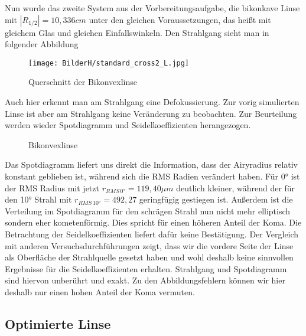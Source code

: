 \documentclass[twoside,colorback,accentcolor=tud4c,11pt]{tudreport}
\begin{document}
	Nun wurde das zweite System aus der Vorbereitungsaufgabe, die bikonkave Linse mit $|R_{1/2}| = 10,336 cm$ unter den gleichen Voraussetzungen, das heißt mit gleichem Glas und gleichen Einfallswinkeln. Den Strahlgang sieht man in folgender Abbildung 
	
	\begin{figure}[H]
\centering
   	\begin{minipage}[b]{\textwidth}
\centering   	\texttt{[image: BilderH/standard\_cross2\_L.jpg]}
   	\caption{Querschnitt der Bikonvexlinse}
  	\end{minipage}
\end{figure}
	
	Auch hier erkennt man am Strahlgang eine Defokussierung. Zur vorig simulierten Linse ist aber am Strahlgang keine Veränderung zu beobachten. Zur Beurteilung werden wieder Spotdiagramm und Seidelkoeffizienten herangezogen.
	
	\begin{figure}[H]
\centering
  \quad
  \quad   
  \caption{Bikonvexlinse}
\end{figure}
	
	Das Spotdiagramm liefert uns direkt die Information, dass der Airyradius relativ konstant geblieben ist, während sich die RMS Radien verändert haben. Für 0° ist der RMS Radius mit jetzt $r_{RMS \, 0°} = 119,40 \mu m $ deutlich kleiner, während der für den 10° Strahl mit $r_{RMS \, 10°} = 492,27 $ geringfügig gestiegen ist. Außerdem ist die Verteilung im Spotdiagramm für den schrägen Strahl nun nicht mehr elliptisch sondern eher kometenförmig. Dies spricht für einen höheren Anteil der Koma. Die Betrachtung der Seidelkoeffizienten liefert dafür keine Bestätigung. Der Vergleich mit anderen Versuchsdurchführungen zeigt, dass wir die vordere Seite der Linse als Oberfläche der Strahlquelle gesetzt haben und wohl deshalb keine sinnvollen Ergebnisse für die Seidelkoeffizienten erhalten. Strahlgang und Spotdiagramm sind hiervon unberührt und exakt. 
	Zu den Abbildungsfehlern können wir hier deshalb nur einen hohen Anteil der Koma vermuten.
	
	\subsection{Optimierte Linse}
	
\end{document}
